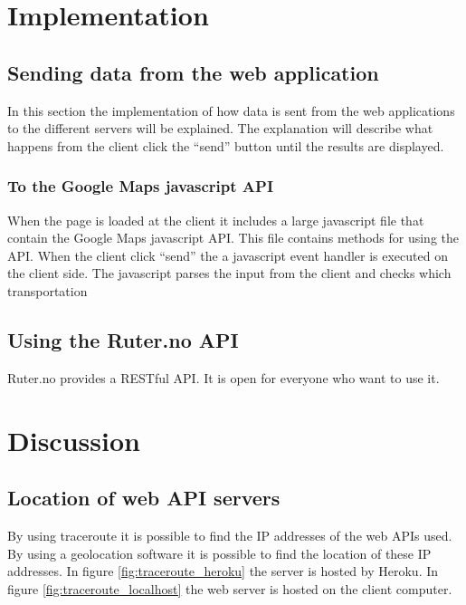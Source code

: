 \documentclass[10pt,a4paper]{article}
\begin{document}
\section{Implementation}

\subsection{Sending data from the web application}
\label{sec:sending-data-from}
In this section the implementation of how data is sent from the web applications to the different servers will be explained. The explanation will describe what happens from the client click the ``send'' button until the results are displayed.
\subsubsection{To the Google Maps javascript API}
\label{sec:google-maps-javascr}
When the page is loaded at the client it includes a large javascript file that contain the Google Maps javascript API. This file contains methods for using the API.
When the client click ``send'' the a javascript event handler is executed on the client side. The javascript parses the input from the client and checks which transportation 


\subsection{Using the Ruter.no API}

\label{sec:using-ruter.no-api}
Ruter.no provides a RESTful API. It is open for everyone who want to use it.

\section{Discussion}

\subsection{Location of web API servers}
By using traceroute it is possible to find the IP addresses of the web APIs used. By using a geolocation software it is possible to find the location of these IP addresses. In figure \ref{fig:traceroute_heroku} the server is hosted by Heroku. In figure \ref{fig:traceroute_localhost} the web server is hosted on the client computer. 
\end{document}
